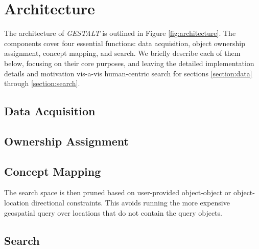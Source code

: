 \section{Architecture}
\label{section:architecture}

\begin{figure*}[t]
    
    \centering
    \caption[width=\textwidth]{The architecture of \emph{GESTALT} consists of the data collection subsystem, the ownership assignment process, the concept mapping process and the search subsystem.}
    \label{fig:architecture}
\end{figure*}

The architecture of \textit{GESTALT} is outlined in Figure \ref{fig:architecture}. The components cover four essential functions: data acquisition, object ownership assignment, concept mapping, and search. We briefly describe each of them below, focusing on their core purposes, and leaving the detailed implementation details and motivation vis-a-vis human-centric search for sections \ref{section:data} through \ref{section:search}. 

\subsection{Data Acquisition}

\subsection{Ownership Assignment}

\subsection{Concept Mapping}

The search space is then pruned based on user-provided object-object or object-location directional constraints.
This avoids running the more expensive geospatial query over locations that do not contain the query objects.


\subsection{Search}

